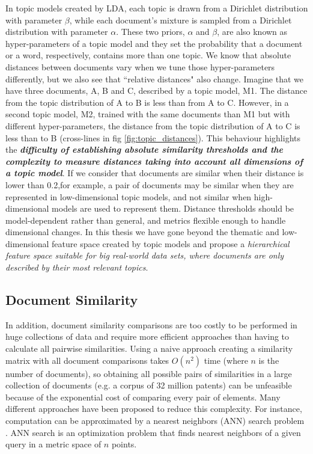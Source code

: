 In topic models created by LDA, each topic is drawn from a Dirichlet distribution with parameter $\beta$, while each document's mixture is sampled from a Dirichlet distribution with parameter $\alpha$. These two priors, $\alpha$ and $\beta$, are also known as hyper-parameters of a topic model and they set the probability that a document or a word, respectively, contains more than one topic. We know that absolute distances between documents vary when we tune those hyper-parameters differently, but we also see that ``relative distances" also change. Imagine that we have three documents, A, B and C, described by a topic model, M1. The distance from the topic distribution of A to B is less than from A to C. However, in a second topic model, M2, trained with the same documents than M1 but with different hyper-parameters, the distance from the topic distribution of A to C is less than to B (cross-lines in fig \ref{fig:topic_distances}). This behaviour highlights the \textbf{\textit{difficulty of establishing absolute similarity thresholds and the complexity to measure distances taking into account all dimensions of a topic model}}. If we consider that documents are similar when their distance is lower than 0.2,for example, a pair of documents may be similar when they are represented in low-dimensional topic models, and not similar when high-dimensional models are used to represent them. Distance thresholds should be model-dependent rather than general, and metrics flexible enough to handle dimensional changes. In this thesis we have gone beyond the thematic and low-dimensional feature space created by topic models and propose a \textit{ hierarchical feature space suitable for big real-world data sets, where documents are only described by their most relevant topics}.


\subsection{Document Similarity}
\label{sec:document-similarity}

In addition, document similarity comparisons are too costly to be performed in huge collections of data and require more efficient approaches than having to calculate all pairwise similarities. Using a naive approach creating a similarity matrix with all document comparisons takes $O(n^2)$ time (where $n$ is the number of documents), so obtaining all possible pairs of similarities in a large collection of documents (e.g. a corpus of 32 million patents) can be unfeasible because of the exponential cost of comparing every pair of elements. Many different approaches have been proposed to reduce this complexity. For instance, computation can be approximated by a nearest neighbors (ANN) search problem \citep{Indyk1998}. ANN search is an optimization problem that finds nearest neighbors of a given query in a metric space of $n$ points. 

